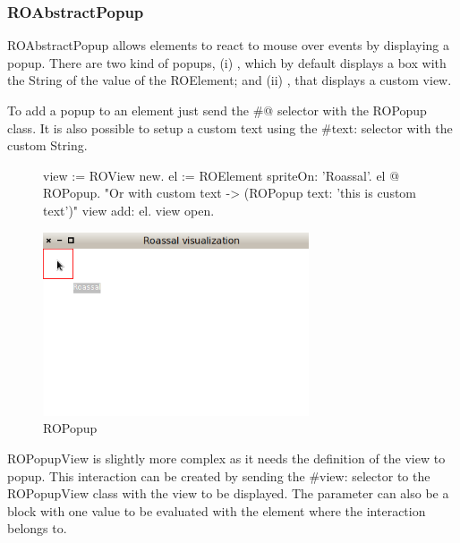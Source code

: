 \documentclass[a4paper,10pt,twoside]{book}
\begin{document}
\subsubsection*{ROAbstractPopup}

ROAbstractPopup allows elements to react to mouse over events by displaying a popup. There are two kind of popups, (i) , which by default displays a box with the String of the value of the ROElement; and (ii) , that displays a custom view.

To add a popup to an element just send the \#@ selector with the ROPopup class. It is also possible to setup a custom text using the \#text: selector with the custom String.

\begin{figure}[H]
      \begin{minipage}[t]{1\textwidth}
      \vspace{0pt}
     \begin{code}{}
view := ROView new.
el := ROElement spriteOn: 'Roassal'.
el @ ROPopup. "Or with custom text -> (ROPopup text: 'this is custom text')"
view add: el.
view open.
  \end{code}
   \end{minipage}
   \hfill
   \begin{minipage}[t]{1\textwidth}
	 \vspace{0pt} \raggedright
       \centering
		\includegraphics[width=0.7\textwidth]{popup}
   \end{minipage}
\label{fig:popup}
\caption{ROPopup}
\end{figure} 

ROPopupView is slightly more complex as it needs the definition of the view to popup. This interaction can be created by sending the \#view: selector to the ROPopupView class with the view to be displayed. The parameter can also be a block with one value to be evaluated with the element where the interaction belongs to.
\end{document}
